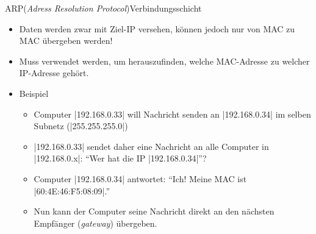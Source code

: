 \begin{frame}[fragile]{ARP(\textit{Adress Resolution Protocol})}{Verbindungsschicht}
\begin{itemize}[<+->]
\item Daten werden zwar mit Ziel-IP versehen, können jedoch nur von MAC zu MAC übergeben werden!
\item Muss verwendet werden, um herauszufinden, welche MAC-Adresse zu welcher IP-Adresse gehört.
\item Beispiel
\begin{itemize}
\item Computer \commandbox|192.168.0.33| will Nachricht senden an \commandbox|192.168.0.34| im selben Subnetz (\commandBluebox|255.255.255.0|)
\item \commandbox|192.168.0.33| sendet daher eine Nachricht an alle Computer in \commandbox|192.168.0.x|: ``Wer hat die IP \commandbox|192.168.0.34|''?
\item Computer \commandbox|192.168.0.34| antwortet: ``Ich! Meine MAC ist \commandbox|60:4E:46:F5:08:09|.''
\item Nun kann der Computer seine Nachricht direkt an den nächsten Empfänger (\textit{gateway}) übergeben.
\end{itemize}
\end{itemize}
\end{frame}